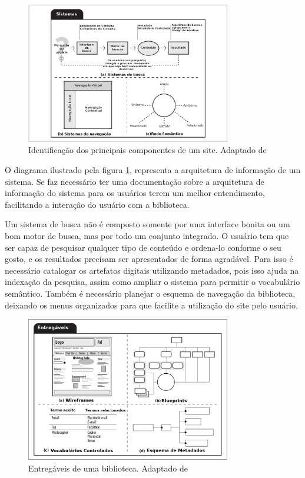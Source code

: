 \graphicspath{{figuras/}}
\begin{figure}[H]
\centering
\includegraphics[width=0.8\textwidth]{sistemas}
\caption[Identificação dos principais componentes de uma biblioteca]{Identificação dos principais componentes de um site. Adaptado de \cite{rosenfeld2002information}}
\label{fig:sistemasoftware}
\end{figure}

O diagrama ilustrado pela figura \ref{fig:sistemasoftware}, representa a arquitetura de informação de um sistema. Se faz necessário ter uma documentação sobre a arquitetura de informação do sistema para os usuários terem um melhor entendimento, facilitando a interação do usuário com a biblioteca.

Um sistema de busca não é composto somente por uma interface bonita ou um bom motor de busca, mas por todo um conjunto integrado. O usuário tem que ser capaz de pesquisar qualquer tipo de conteúdo e ordena-lo conforme o seu gosto, e os resultados precisam ser apresentados de forma agradável. Para isso é necessário catalogar os artefatos digitais utilizando metadados, pois isso ajuda na indexação da pesquisa, assim como ampliar o sistema para permitir o vocabulário semântico. Também é necessário planejar o esquema de navegação da biblioteca, deixando os menus organizados para que facilite a utilização do site pelo usuário.

\graphicspath{{figuras/}}
\begin{figure}[H]
\centering
\includegraphics[width=0.8\textwidth]{entregaveis}
\caption[Entregáveis de uma biblioteca]{Entregáveis de uma biblioteca. Adaptado de \cite{rosenfeld2002information}}
\label{fig:entregaveissoftware}
\end{figure}


